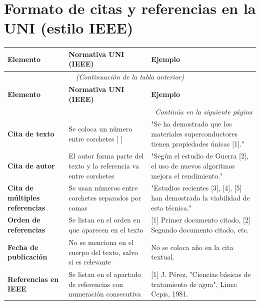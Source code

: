 \documentclass{report}
\newcommand{\greencheck}{{\color{green}\ding{51}}} %
\begin{document}
\section*{\color{red} Formato de citas y referencias en la UNI (estilo IEEE) \greencheck}

\begin{longtable}{|p{4cm}|p{7cm}|p{7cm}|}
     \hline
    \textbf{Elemento} & \textbf{Normativa UNI (IEEE)} & \textbf{Ejemplo} \\ \hline
    \endfirsthead

    \multicolumn{3}{c}{{\textit{(Continuación de la tabla anterior)}}} \\ \hline
    \textbf{Elemento} & \textbf{Normativa UNI (IEEE)} & \textbf{Ejemplo} \\ \hline
    \endhead

    \hline \multicolumn{3}{|r|}{{\textit{Continúa en la siguiente página}}} \\ \hline
    \endfoot

    \hline
    \endlastfoot

    \textbf{Cita de texto} & Se coloca un número entre corchetes [ ] & "Se ha demostrado que los materiales superconductores tienen propiedades únicas [1]." \\ \hline

    \textbf{Cita de autor} & El autor forma parte del texto y la referencia va entre corchetes & "Según el estudio de Guerra [2], el uso de nuevos algoritmos mejora el rendimiento." \\ \hline

    \textbf{Cita de múltiples referencias} & Se usan números entre corchetes separados por comas & "Estudios recientes [3], [4], [5] han demostrado la viabilidad de esta técnica." \\ \hline

    \textbf{Orden de referencias} & Se listan en el orden en que aparecen en el texto & [1] Primer documento citado, [2] Segundo documento citado, etc. \\ \hline

    \textbf{Fecha de publicación} & No se menciona en el cuerpo del texto, salvo si es relevante & No se coloca año en la cita textual. \\ \hline

    \textbf{Referencias en IEEE} & Se listan en el apartado de referencias con numeración consecutiva & [1] J. Pérez, "Ciencias básicas de tratamiento de agua", Lima: Cepis, 1981. \\ \hline

\end{longtable}
\end{document}
